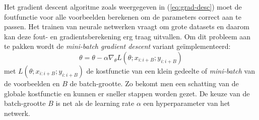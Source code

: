 \npar Het gradient descent algoritme zoals weergegeven in (\ref{eq:grad-desc}) moet de foutfunctie voor alle voorbeelden berekenen om de parameters correct aan te passen. Het trainen van neurale netwerken vraagt om grote datasets en daarom kan deze fout- en gradientsberekening erg traag uitvallen. Om dit probleem aan te pakken wordt de \textit{mini-batch gradient descent} variant ge\"implementeerd:
\begin{equation}\label{eq:mini-grad-desc}
\theta = \theta - \alpha \nabla_\theta L(\theta;x_{i:i+B};y_{i:i+B})
\end{equation}
met $L(\theta;x_{i:i+B};y_{i:i+B})$ de kostfunctie van een klein gedeelte of \textit{mini-batch} van de voorbeelden en $B$ de batch-grootte. Zo bekomt men een schatting van de globale kostfunctie en kunnen er sneller stappen worden gezet. De keuze van de batch-grootte $B$ is net als de learning rate $\alpha$ een hyperparameter van het netwerk. 
